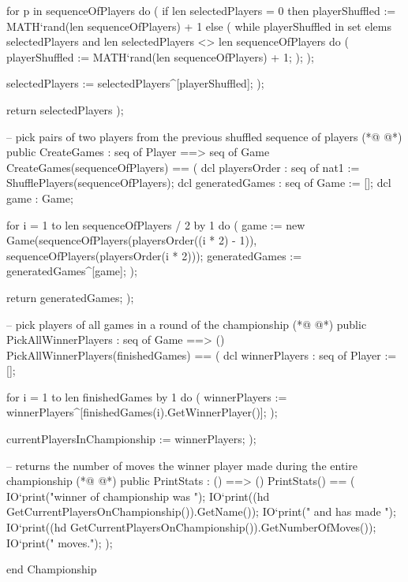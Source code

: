 \begin{vdmpp}[breaklines=true]
   for p in sequenceOfPlayers do (
    if len selectedPlayers = 0
     then
      playerShuffled := MATH`rand(len sequenceOfPlayers) + 1
    else (
     while playerShuffled in set elems selectedPlayers and len selectedPlayers <> len sequenceOfPlayers do (
      playerShuffled := MATH`rand(len sequenceOfPlayers) + 1;
     );
    );
    
    selectedPlayers := selectedPlayers^[playerShuffled];
   );
   
   return selectedPlayers
  );
  
 -- pick pairs of two players from the previous shuffled sequence of players
(*@
\label{CreateGames:86}
@*)
 public CreateGames : seq of Player ==> seq of Game
  CreateGames(sequenceOfPlayers) == (
   dcl playersOrder : seq of nat1 := ShufflePlayers(sequenceOfPlayers);
   dcl generatedGames : seq of Game := [];
   dcl game : Game;
   
   for i = 1 to len sequenceOfPlayers / 2 by 1 do (
    game := new Game(sequenceOfPlayers(playersOrder((i * 2) - 1)), sequenceOfPlayers(playersOrder(i * 2))); 
    generatedGames := generatedGames^[game];
   );
   
   return generatedGames;
  );
  
 -- pick players of all games in a round of the championship
(*@
\label{PickAllWinnerPlayers:101}
@*)
 public PickAllWinnerPlayers : seq of Game ==> ()
  PickAllWinnerPlayers(finishedGames) == (
   dcl winnerPlayers : seq of Player := [];
   
   for i = 1 to len finishedGames by 1 do (
    winnerPlayers := winnerPlayers^[finishedGames(i).GetWinnerPlayer()];
   );
   
   currentPlayersInChampionship := winnerPlayers;
  );
  
 -- returns the number of moves the winner player made during the entire championship
(*@
\label{PrintStats:113}
@*)
 public PrintStats : () ==> ()
  PrintStats() == (
   IO`print("\nThe winner of championship was ");
   IO`print((hd GetCurrentPlayersOnChampionship()).GetName());
   IO`print(" and has made ");
   IO`print((hd GetCurrentPlayersOnChampionship()).GetNumberOfMoves());
   IO`print(" moves.\n\n");
  );

end Championship
\end{vdmpp}
